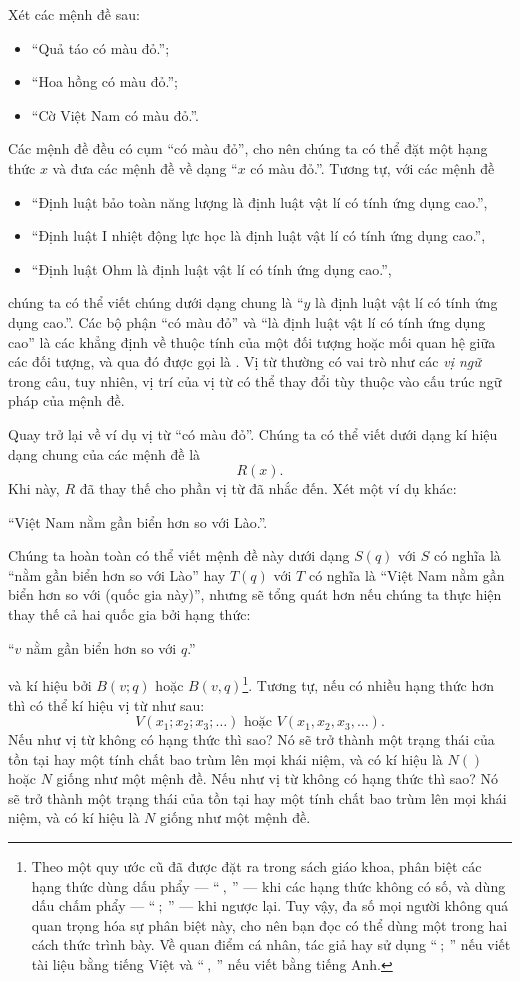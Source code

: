 Xét các mệnh đề sau:
\begin{itemize}
    \item ``Quả táo có màu đỏ.'';
    \item ``Hoa hồng có màu đỏ.'';
    \item ``Cờ Việt Nam có màu đỏ.''.
\end{itemize}
Các mệnh đề đều có cụm ``có màu đỏ'', cho nên chúng ta có thể đặt một hạng thức $x$ và đưa các mệnh đề về dạng ``$x$ có màu đỏ.''. Tương tự, với các mệnh đề
\begin{itemize}
    \item ``Định luật bảo toàn năng lượng là định luật vật lí có tính ứng dụng cao.'',
    \item ``Định luật I nhiệt động lực học là định luật vật lí có tính ứng dụng cao.'',
    \item ``Định luật Ohm là định luật vật lí có tính ứng dụng cao.'',
\end{itemize}
chúng ta có thể viết chúng dưới dạng chung là ``$y$ là định luật vật lí có tính ứng dụng cao.''. Các bộ phận ``có màu đỏ'' và ``là định luật vật lí có tính ứng dụng cao'' là các khẳng định về thuộc tính của một đối tượng hoặc mối quan hệ giữa các đối tượng, và qua đó được gọi là . Vị từ thường có vai trò như các \emph{vị ngữ} trong câu, tuy nhiên, vị trí của vị từ có thể thay đổi tùy thuộc vào cấu trúc ngữ pháp của mệnh đề.

Quay trở lại về ví dụ vị từ ``có màu đỏ''. Chúng ta có thể viết dưới dạng kí hiệu dạng chung của các mệnh đề là
$$R(x).$$
Khi này, $R$ đã thay thế cho phần vị từ đã nhắc đến. Xét một ví dụ khác:
\begin{center}
    ``Việt Nam nằm gần biển hơn so với Lào.''.
\end{center}
Chúng ta hoàn toàn có thể viết mệnh đề này dưới dạng $S(q)$ với $S$ có nghĩa là ``nằm gần biển hơn so với Lào'' hay $T(q)$ với $T$ có nghĩa là ``Việt Nam nằm gần biển hơn so với (quốc gia này)'', nhưng sẽ tổng quát hơn nếu chúng ta thực hiện thay thế cả hai quốc gia bởi hạng thức:
\begin{center}
    ``$v$ nằm gần biển hơn so với $q$.''
\end{center}
và kí hiệu bởi $B(v; q)$ hoặc $B(v, q)$\footnote{Theo một quy ước cũ đã được đặt ra trong sách giáo khoa, phân biệt các hạng thức dùng dấu phẩy --- ``$~,~$'' --- khi các hạng thức không có số, và dùng dấu chấm phẩy --- ``$~;~$'' --- khi ngược lại. Tuy vậy, đa số mọi người không quá quan trọng hóa sự phân biệt này, cho nên bạn đọc có thể dùng một trong hai cách thức trình bày. Về quan điểm cá nhân, tác giả hay sử dụng ``$~;~$'' nếu viết tài liệu bằng tiếng Việt và ``$~,~$'' nếu viết bằng tiếng Anh.}. Tương tự, nếu có nhiều hạng thức hơn thì có thể kí hiệu vị từ như sau:
$$
V(x_1;x_2;x_3;\dots) \text{ hoặc } V(x_1,x_2,x_3,\dots).
$$
Nếu như vị từ không có hạng thức thì sao? Nó sẽ trở thành một trạng thái của tồn tại hay một tính chất bao trùm lên mọi khái niệm, và có kí hiệu là $N()$ hoặc $N$ giống như một mệnh đề.
Nếu như vị từ không có hạng thức thì sao? Nó sẽ trở thành một trạng thái của tồn tại hay một tính chất bao trùm lên mọi khái niệm, và có kí hiệu là $N$ giống như một mệnh đề.

